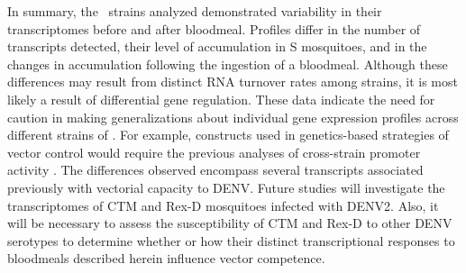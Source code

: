 In summary, the \Aa\ strains analyzed demonstrated variability in their transcriptomes before and after bloodmeal.
Profiles differ in the number of transcripts detected, their level of accumulation in S mosquitoes, and in the changes in accumulation following the ingestion of a bloodmeal.
Although these differences may result from distinct RNA turnover rates among strains, it is most likely a result of differential gene regulation.
These data indicate the need for caution in making generalizations about individual gene expression profiles across different strains of \Aa.
For example, constructs used in genetics-based strategies of vector control would require the previous analyses of cross-strain promoter activity \cite{James2011}.
The differences observed encompass several transcripts associated previously with vectorial capacity to DENV.
Future studies will investigate the transcriptomes of \gls{CTM} and \gls{Rex-D} mosquitoes infected with \gls{DENV2}.
Also, it will be necessary to assess the susceptibility of \gls{CTM} and \gls{Rex-D} to other DENV serotypes to determine whether or how their distinct transcriptional responses to bloodmeals described herein influence vector competence.




